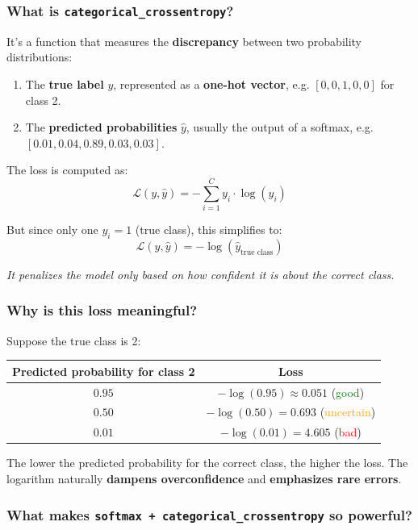 \documentclass[11pt]{article}
\begin{document}
\subsubsection*{What is \texttt{categorical\_crossentropy}?}

It’s a function that measures the \textbf{discrepancy} between two probability distributions:
\begin{enumerate}
    \item The \textbf{true label} $y$, represented as a \textbf{one-hot vector}, e.g. $[0, 0, 1, 0, 0]$ for class 2.
    \item The \textbf{predicted probabilities} $\hat{y}$, usually the output of a softmax, e.g. $[0.01, 0.04, 0.89, 0.03, 0.03]$.
\end{enumerate}

The loss is computed as:
\[
\mathcal{L}(y, \hat{y}) = -\sum_{i=1}^C y_i \cdot \log(\hat{y}_i)
\]

But since only one $y_i = 1$ (true class), this simplifies to:
\[
\mathcal{L}(y, \hat{y}) = -\log(\hat{y}_{\text{true class}})
\]

\textit{It penalizes the model only based on how confident it is about the correct class.}

\subsubsection*{Why is this loss meaningful?}

Suppose the true class is 2:

\begin{center}
\begin{tabular}{|c|c|}
\hline
Predicted probability for class 2 & Loss \\
\hline
$0.95$ & $-\log(0.95) \approx 0.051$ \quad (\textcolor{green}{good}) \\
$0.50$ & $-\log(0.50) = 0.693$ \quad (\textcolor{orange}{uncertain}) \\
$0.01$ & $-\log(0.01) = 4.605$ \quad (\textcolor{red}{bad}) \\
\hline
\end{tabular}
\end{center}

The lower the predicted probability for the correct class, the higher the loss.
The logarithm naturally \textbf{dampens overconfidence} and \textbf{emphasizes rare errors}.

\subsubsection*{What makes \texttt{softmax + categorical\_crossentropy} so powerful?}
\end{document}
